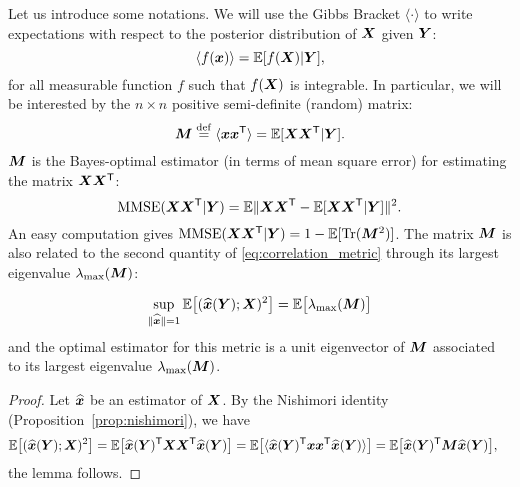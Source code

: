 \documentclass[12pt,nocut]{article}
\begin{document}
Let us introduce some notations. We will use the Gibbs Bracket $\langle \cdot \rangle$ to write expectations with respect to the posterior distribution of ${\boldsymbol X}$ given ${\boldsymbol Y}$:
$$
\langle f({\boldsymbol x}) \rangle = \mathbb{E}[f({\boldsymbol X})|{\boldsymbol Y}],
$$
for all measurable function $f$ such that $f({\boldsymbol X})$ is integrable.
In particular, we will be interested by the $n \times n$ positive semi-definite (random) matrix:
\begin{equation}\label{eq:def_M}
{\boldsymbol M} \overset{{\rm def}}{=} \langle {\boldsymbol x} {\boldsymbol x}^{{\sf T}} \rangle = \mathbb{E}[{\boldsymbol X}{\boldsymbol X}^{{\sf T}}|{\boldsymbol Y}].
\end{equation}
${\boldsymbol M}$ is the Bayes-optimal estimator (in terms of mean square error) for estimating the matrix ${\boldsymbol X} {\boldsymbol X}^{{\sf T}}$:
\begin{equation}\label{eq:def_matrix_mse}
{{\rm MMSE}}({\boldsymbol X}{\boldsymbol X}^{{\sf T}}|{\boldsymbol Y}) = \mathbb{E} \| {\boldsymbol X}{\boldsymbol X}^{{\sf T}} - \mathbb{E}[{\boldsymbol X}{\boldsymbol X}^{{\sf T}}|{\boldsymbol Y}] \|^2.
\end{equation}
An easy computation gives ${{\rm MMSE}}({\boldsymbol X}{\boldsymbol X}^{{\sf T}}|{\boldsymbol Y}) = 1 - \mathbb{E} [{{\rm Tr}}({\boldsymbol M}^2)]$.
The matrix ${\boldsymbol M}$ is also related to the second quantity of \eqref{eq:correlation_metric} through its largest eigenvalue $\lambda_{\rm max}({\boldsymbol M})$:
\begin{lemma}\label{lem:lambda_max}
	$$
	\sup_{\|\widehat{{\boldsymbol x}}\| = 1} \mathbb{E}\big[(\widehat{{\boldsymbol x}}({\boldsymbol Y}); {\boldsymbol X})^2\big] = \mathbb{E}\big[\lambda_{\rm max}({\boldsymbol M})\big]
	$$
	and the optimal estimator for this metric is a unit eigenvector of ${\boldsymbol M}$ associated to its largest eigenvalue $\lambda_{\rm max}({\boldsymbol M})$.
\end{lemma}
\begin{proof}
Let $\widehat{{\boldsymbol x}}$ be an estimator of ${\boldsymbol X}$. By the Nishimori identity (Proposition~\ref{prop:nishimori}), we have
	\begin{align*}
\mathbb{E}\big[(\widehat{{\boldsymbol x}}({\boldsymbol Y}); {\boldsymbol X})^2\big]
&=
\mathbb{E}\big[\widehat{{\boldsymbol x}}({\boldsymbol Y})^{{\sf T}} {\boldsymbol X}{\boldsymbol X}^{{\sf T}} \widehat{{\boldsymbol x}}({\boldsymbol Y})\big]
=
\mathbb{E}\big[\langle \widehat{{\boldsymbol x}}({\boldsymbol Y})^{{\sf T}} {\boldsymbol x}{\boldsymbol x}^{{\sf T}} \widehat{{\boldsymbol x}}({\boldsymbol Y}) \rangle\big]
=
\mathbb{E}\big[ \widehat{{\boldsymbol x}}({\boldsymbol Y})^{{\sf T}} {\boldsymbol M} \widehat{{\boldsymbol x}}({\boldsymbol Y}) \big],
	\end{align*}
	the lemma follows.
\end{proof}
\\

\end{document}
